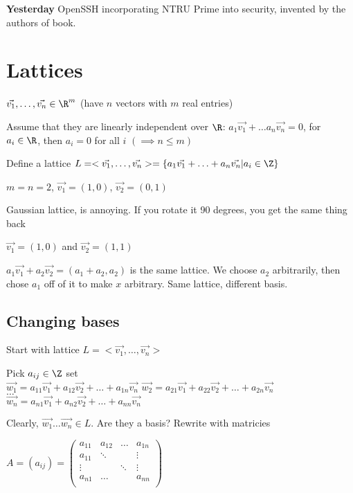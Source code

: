 \documentclass[10pt]{article}
\begin{document}
\textbf{Yesterday} OpenSSH incorporating NTRU Prime into security, invented by the authors of book.

\section{Lattices}
$\vec{v_1}, \ldots, \vec{v_n} \in \R^m$ (have $n$ vectors with $m$ real entries)

Assume that they are linearly independent over $\R$: $a_1\vec{v_1} + \ldots a_n\vec{v_n} = 0$, for $a_i \in \R$, then $a_i = 0$ for all $i$ $(\implies n \leq m)$

\begin{defn}
    Define a lattice $L = <\vec{v_1}, \ldots, \vec{v_n}> = \{a_1\vec{v_1} + \ldots + a_n\vec{v_n} | a_i \in \Z\}$
\end{defn}

\begin{exm}
    $m = n = 2$, $\vec{v_1} = (1, 0)$, $\vec{v_2} = (0, 1)$
\end{exm}
Gaussian lattice, is annoying. If you rotate it 90 degrees, you get the same thing back

\begin{exm}
    $\vec{v_1} = (1, 0)$ and $\vec{v_2} = (1, 1)$
\end{exm}
$a_1\vec{v_1} + a_2\vec{v_2} = (a_1 + a_2, a_2)$ is the same lattice. We choose $a_2$ arbitrarily, then chose $a_1$ off of it to make $x$ arbitrary. Same lattice, different basis.

\subsection{Changing bases}
Start with lattice $L = <\vec{v_1}, \ldots, \vec{v_n}>$

Pick $a_{ij} \in \Z$ set \\
$\vec{w_1} = a_{11}\vec{v_1} + a_{12}\vec{v_2} + \ldots + a_{1n}\vec{v_n}$
$\vec{w_2} = a_{21}\vec{v_1} + a_{22}\vec{v_2} + \ldots + a_{2n}\vec{v_n}$\\
$\ldots$\\
$\vec{w_n} = a_{n1}\vec{v_1} + a_{n2}\vec{v_2} + \ldots + a_{nn}\vec{v_n}$

Clearly, $\vec{w_1} \ldots \vec{w_n} \in L$. Are they a basis? Rewrite with matricies

$A = (a_{ij}) = \begin{pmatrix}
    a_{11} & a_{12} & \ldots & a_{1n}\\
    a_{11} & \ddots & & \vdots\\
    \vdots & & \ddots & \vdots \\
    a_{n1} & \ldots && a_{nn}\\
\end{pmatrix}$
\end{document}
